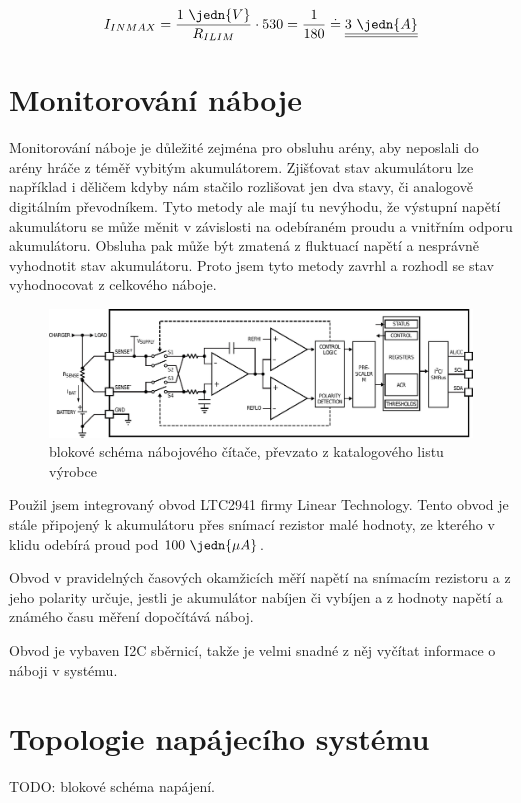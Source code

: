 $$I_{IN MAX} = \dfrac{1~\jedn{V}}{R_{ILIM}} \cdot 530 = \dfrac{1}{180} \doteq \underline{\underline{3~\jedn{A}}}$$ \nonumber

\section{Monitorování náboje}
Monitorování náboje je důležité zejména pro obsluhu arény, aby neposlali do arény hráče z téměř vybitým akumulátorem. Zjišťovat stav akumulátoru lze například i děličem kdyby nám stačilo rozlišovat jen dva stavy, či analogově digitálním převodníkem. Tyto metody ale mají tu nevýhodu, že výstupní napětí akumulátoru se může měnit v závislosti na odebíraném proudu a vnitřním odporu akumulátoru. Obsluha pak může být zmatená z fluktuací napětí a nesprávně vyhodnotit stav akumulátoru. Proto jsem tyto metody zavrhl a rozhodl se stav vyhodnocovat z celkového náboje.

\begin{figure}[H]
    \begin{center}
        \includegraphics[width=\textwidth]{img/LTC2941-block}
    \end{center}
    \caption{blokové schéma nábojového čítače, převzato z katalogového listu výrobce}
\end{figure}
Použil jsem integrovaný obvod LTC2941 firmy Linear Technology. Tento obvod je stále připojený k akumulátoru přes snímací rezistor malé hodnoty, ze kterého v klidu odebírá proud pod $100~\jedn{\mu A}$.

Obvod v pravidelných časových okamžicích měří napětí na snímacím rezistoru a z jeho polarity určuje, jestli je akumulátor nabíjen či vybíjen a z hodnoty napětí a známého času měření dopočítává náboj.

Obvod je vybaven I2C sběrnicí, takže je velmi snadné z něj vyčítat informace o náboji v systému.

\section{Topologie napájecího systému}
TODO: blokové schéma napájení.
